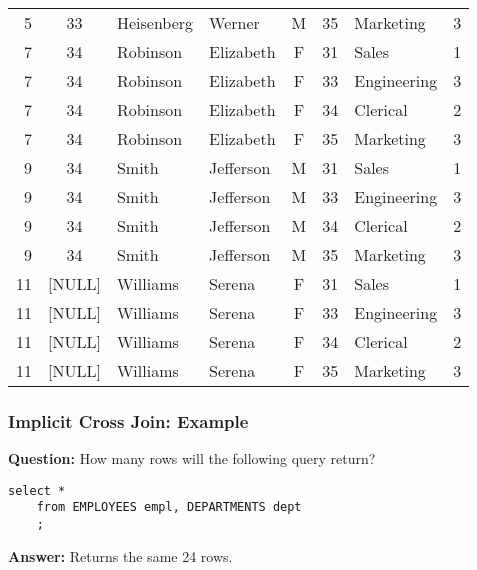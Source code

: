 \documentclass{beamer}
\begin{document}
\begin{frame}
\begin{center}
{\begin{tabulary}{\textwidth}{RCLLCRLC}
        5   & 33       & Heisenberg & Werner      & M      & 35       & Marketing   & 3           \\
        7   & 34       & Robinson   & Elizabeth   & F      & 31       & Sales       & 1           \\
        7   & 34       & Robinson   & Elizabeth   & F      & 33       & Engineering & 3           \\
        7   & 34       & Robinson   & Elizabeth   & F      & 34       & Clerical    & 2           \\
        7   & 34       & Robinson   & Elizabeth   & F      & 35       & Marketing   & 3           \\
        9   & 34       & Smith      & Jefferson   & M      & 31       & Sales       & 1           \\
        9   & 34       & Smith      & Jefferson   & M      & 33       & Engineering & 3           \\
        9   & 34       & Smith      & Jefferson   & M      & 34       & Clerical    & 2           \\
        9   & 34       & Smith      & Jefferson   & M      & 35       & Marketing   & 3           \\
        11  & [NULL]   & Williams   & Serena      & F      & 31       & Sales       & 1           \\
        11  & [NULL]   & Williams   & Serena      & F      & 33       & Engineering & 3           \\
        11  & [NULL]   & Williams   & Serena      & F      & 34       & Clerical    & 2           \\
        11  & [NULL]   & Williams   & Serena      & F      & 35       & Marketing   & 3           \\
      \end{tabulary}
    }
  \end{center}

\end{frame}

\begin{frame}[containsverbatim] %
  \frametitle{Implicit Cross Join: Example}
  
  \textbf{Question:} How many rows will the following query return?
  \bigskip

  \begin{lstlisting}[title={\tiny Source: https://github.com/Choens/sql-survival-guide/blob/master/sql/04-joins/cross-join.sql}]
    select *
    from EMPLOYEES empl, DEPARTMENTS dept
    ;
  \end{lstlisting}
  \bigskip
  
  \textbf{Answer: } Returns the same 24 rows.
  
  
\end{frame}
\end{document}
